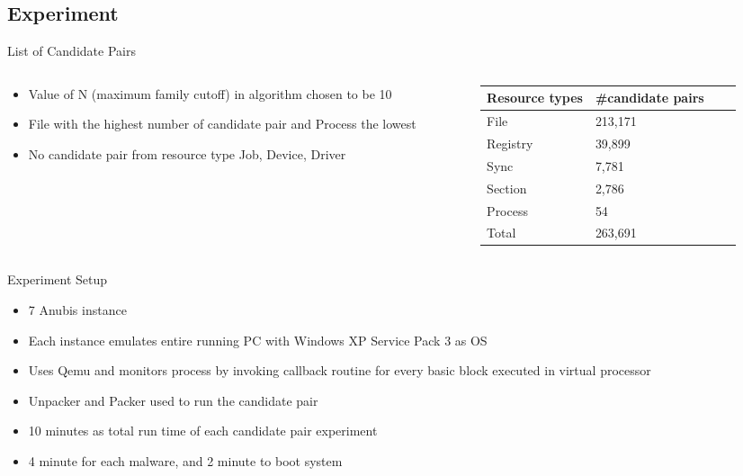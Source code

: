 \documentclass[]{beamer}
\begin{document}
\subsection{Experiment}
\label{sub:Experiment}
\begin{frame}[t]{List of Candidate Pairs}
\begin{columns}
\begin{column}{4.7cm}
\begin{itemize}
  \item Value of N (maximum family cutoff) in algorithm chosen to be 10
  \item File with the highest number of candidate pair and Process the lowest
  \item No candidate pair from resource type Job, Device, Driver
\end{itemize}
\end{column}
\begin{column}{5.3cm}
  \begin{tabular}{l l l l}
    \toprule
    Resource types & \#candidate pairs\\
    \midrule
    File & 213,171 \\
    Registry & 39,899 \\
    Sync & 7,781 \\
    Section & 2,786 \\
    Process & 54\\
    \bottomrule
    Total & 263,691\\
  \end{tabular}
\end{column}
\end{columns}
\end{frame}
\begin{frame}[t]{Experiment Setup}
  \begin{itemize}
    \item 7 Anubis instance
    \item Each instance emulates entire running PC with Windows XP Service Pack 3 as OS
    \item Uses Qemu and monitors process by invoking callback routine for every basic block executed in virtual processor
    \item Unpacker and Packer used to run the candidate pair
    \item 10 minutes as total run time of each candidate pair experiment
    \item 4 minute for each malware, and 2 minute to boot system
  \end{itemize}
\end{frame}
\end{document}
